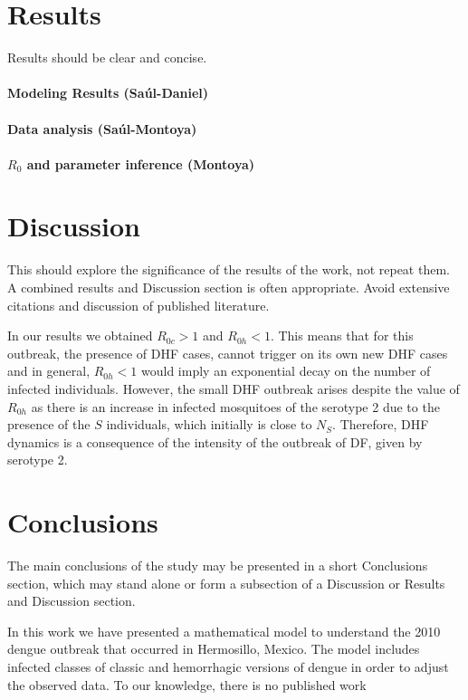 \documentclass[5p, authoryear, final, sort&compress, times]{elsarticle}
\begin{document}
	\section{Results}
		Results should be clear and concise.
		\paragraph{Modeling Results (Saúl-Daniel)}



\paragraph{Data analysis (Saúl-Montoya)}
		\paragraph{$R_0$ and parameter inference (Montoya)}

	\section{Discussion}
		This should explore the significance of the results of 
    the work, not repeat them. A combined results and 
    Discussion section is often appropriate. Avoid extensive 
    citations and discussion of published literature.

    In our results we obtained $R_{0c}>1$ and  $R_{0h}<1$. This means that for this outbreak, the presence of DHF cases, cannot trigger on its own new DHF cases and in general, $R_{0h}<1$ would imply an exponential decay on the number of infected individuals. However, the small DHF outbreak arises despite the value of $R_{0h}$ as there is an increase in infected mosquitoes of the serotype 2 due to the presence of the $S$ individuals, which initially is close to $N_S$. Therefore, DHF dynamics is a consequence of the intensity of the outbreak of DF, given by serotype 2. 
    
    
    
	\section{Conclusions}
	The main conclusions of the study may be presented in a 
    short Conclusions section, which may stand alone or form 
    a subsection of a Discussion or Results and Discussion 
    section.
    
    In this work we have presented a mathematical model to understand the 2010 dengue outbreak that occurred in Hermosillo, Mexico. The model includes infected classes of classic and hemorrhagic versions of dengue in order to adjust the observed data. To our knowledge, there is no published work
	
	
\end{document}
